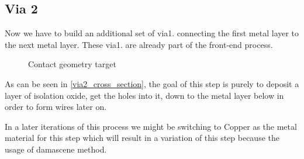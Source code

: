 \subsection{Via 2}\label{chapter_via2}

Now we have to build an additional set of via1. connecting the first metal layer to the next metal layer.
These via1. are already part of the front-end process.

\begin{figure}[H]
	\centering
	\begin{tikzpicture}[node distance = 3cm, auto, thick,scale=\CrossSectionOnly, every node/.style={transform shape}]
		
	\end{tikzpicture}
	\caption{Contact geometry target}
	\label{via2_cross_section}
\end{figure}

As can be seen in \autoref{via2_cross_section}, the goal of this step is purely to deposit a layer of isolation oxide, get the holes into it, down to the metal layer below in order to form wires later on.

In a later iterations of this process we might be switching to Copper as the metal material for this step which will result in a variation of this step because the usage of damascene method.
